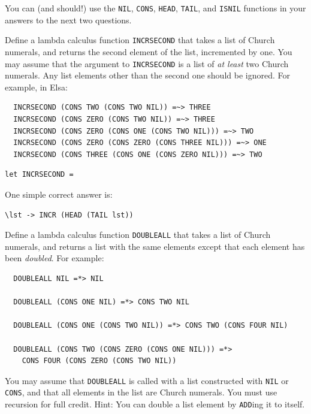 \documentclass[addpoints]{exam}
\begin{document}
\begin{questions}
You can (and should!) use the \texttt{NIL}, \texttt{CONS}, \texttt{HEAD}, \texttt{TAIL}, and \texttt{ISNIL} functions in your answers to the next two questions.

\question[7]

Define a lambda calculus function \texttt{INCRSECOND} that takes a list of Church numerals, and returns the second element of the list, incremented by one.  You may assume that the argument to \texttt{INCRSECOND} is a list of \emph{at least} two Church numerals.  Any list elements other than the second one should be ignored.  For example, in Elsa:

\begin{verbatim}
  INCRSECOND (CONS TWO (CONS TWO NIL)) =~> THREE
  INCRSECOND (CONS ZERO (CONS TWO NIL)) =~> THREE
  INCRSECOND (CONS ZERO (CONS ONE (CONS TWO NIL))) =~> TWO
  INCRSECOND (CONS ZERO (CONS ZERO (CONS THREE NIL))) =~> ONE
  INCRSECOND (CONS THREE (CONS ONE (CONS ZERO NIL))) =~> TWO
\end{verbatim}

\begin{verbatim}
let INCRSECOND = 
\end{verbatim}
\begin{solutionorbox}[2in]
One simple correct answer is:
\begin{verbatim}
\lst -> INCR (HEAD (TAIL lst))
\end{verbatim}
\end{solutionorbox}

\newpage

\question Define a lambda calculus function \texttt{DOUBLEALL} that takes a list of Church numerals, and returns a list with the same elements except that each element has been \emph{doubled}.  For example:

\begin{verbatim}
  DOUBLEALL NIL =*> NIL

  DOUBLEALL (CONS ONE NIL) =*> CONS TWO NIL

  DOUBLEALL (CONS ONE (CONS TWO NIL)) =*> CONS TWO (CONS FOUR NIL)

  DOUBLEALL (CONS TWO (CONS ZERO (CONS ONE NIL))) =*>
    CONS FOUR (CONS ZERO (CONS TWO NIL))
\end{verbatim}

You may assume that \texttt{DOUBLEALL} is called with a list constructed with \texttt{NIL} or \texttt{CONS}, and that all elements in the list are Church numerals.  You must use recursion for full credit.  Hint: You can double a list element by \texttt{ADD}ing it to itself.


\end{questions}
\end{document}
